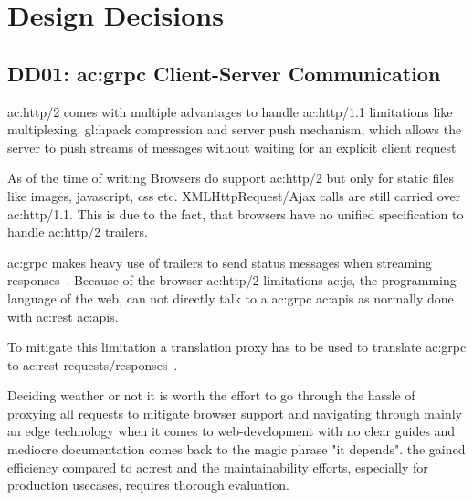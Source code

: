
\section{Design Decisions}

\subsection{DD01: \gls{ac:grpc} Client-Server Communication}

\gls{ac:http}/2 comes with multiple advantages to handle \gls{ac:http}/1.1 limitations like multiplexing, \gls{gl:hpack} compression and server push mechanism, which allows the server to push streams of messages without waiting for an explicit client request~\citep{RFC7540}

As of the time of writing Browsers do support \gls{ac:http}/2 but only for static files like images, javascript, css etc. XMLHttpRequest/Ajax calls are still carried over \gls{ac:http}/1.1. This is due to the fact, that browsers have no unified specification to handle \gls{ac:http}/2 trailers.


\gls{ac:grpc} makes heavy use of trailers to send status messages when streaming responses~\citep{grpcspec}. Because of the browser \gls{ac:http}/2 limitations \gls{ac:js}, the programming language of the web, can not directly talk to a \gls{ac:grpc} \glspl{ac:api} as normally done with \gls{ac:rest} \glspl{ac:api}. 

To mitigate this limitation a translation proxy has to be used to translate \gls{ac:grpc} to \gls{ac:rest} requests/responses~\citep{grpcBrowserState}.



Deciding weather or not it is worth the effort to go through the hassle of proxying all requests to mitigate browser support and navigating through mainly an edge technology when it comes to web-development with no clear guides and mediocre documentation comes back to the magic phrase "it depends". the gained efficiency compared to \gls{ac:rest} and the maintainability efforts, especially for production usecases, requires thorough evaluation.


